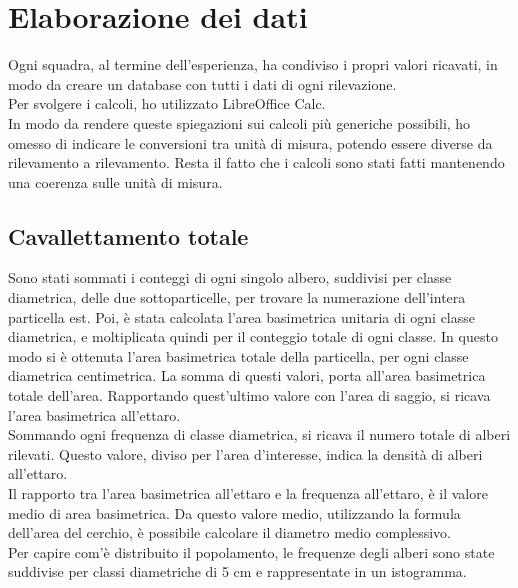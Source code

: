 \section{Elaborazione dei dati}
Ogni squadra, al termine dell'esperienza, ha condiviso i propri valori ricavati, in modo da creare un database con tutti i dati di ogni rilevazione.\\
Per svolgere i calcoli, ho utilizzato LibreOffice Calc.\\
In modo da rendere queste spiegazioni sui calcoli più generiche possibili, ho omesso di indicare le conversioni tra unità di misura, potendo essere diverse da rilevamento a rilevamento. Resta il fatto che i calcoli sono stati fatti mantenendo una coerenza sulle unità di misura.
\subsection{Cavallettamento totale}
Sono stati sommati i conteggi di ogni singolo albero, suddivisi per classe diametrica, delle due sottoparticelle, per trovare la numerazione dell'intera particella est. Poi, è stata calcolata l'area basimetrica unitaria di ogni classe diametrica, e moltiplicata quindi per il conteggio totale di ogni classe. In questo modo si è ottenuta l'area basimetrica totale della particella, per ogni classe diametrica centimetrica. La somma di questi valori, porta all'area basimetrica totale dell'area.
Rapportando quest'ultimo valore con l'area di saggio, si ricava l'area basimetrica all'ettaro.\\
Sommando ogni frequenza di classe diametrica, si ricava il numero totale di alberi rilevati. Questo valore, diviso per l'area d'interesse, indica la densità di alberi all'ettaro.\\
Il rapporto tra l'area basimetrica all'ettaro e la frequenza all'ettaro, è il valore medio di area basimetrica. Da questo valore medio, utilizzando la formula dell'area del cerchio, è possibile calcolare il diametro medio complessivo.\\
Per capire com'è distribuito il popolamento, le frequenze degli alberi sono state suddivise per classi diametriche di 5 cm e rappresentate in un istogramma.
